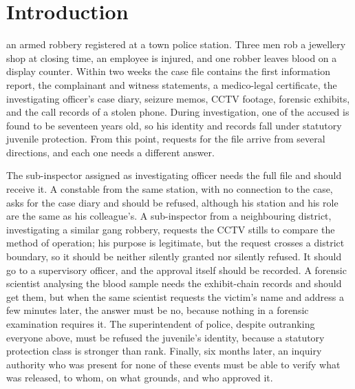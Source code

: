 \section{Introduction}
\label{sec:intro}

 an armed robbery registered at a town police
station. Three men rob a jewellery shop at closing time, an employee is
injured, and one robber leaves blood on a display counter. Within two weeks
the case file contains the first information report, the complainant and
witness statements, a medico-legal certificate, the investigating officer's
case diary, seizure memos, CCTV footage, forensic exhibits, and the call
records of a stolen phone. During investigation, one of the accused is found
to be seventeen years old, so his identity and records fall under statutory
juvenile protection. From this point, requests for the file arrive from
several directions, and each one needs a different answer.

The sub-inspector assigned as investigating officer needs the full file and
should receive it. A constable from the same station, with no connection to
the case, asks for the case diary and should be refused, although his station
and his role are the same as his colleague's. A sub-inspector from a
neighbouring district, investigating a similar gang robbery, requests the
CCTV stills to compare the method of operation; his purpose is legitimate,
but the request crosses a district boundary, so it should be neither silently
granted nor silently refused. It should go to a supervisory officer, and the
approval itself should be recorded. A forensic scientist analysing the blood
sample needs the exhibit-chain records and should get them, but when the same
scientist requests the victim's name and address a few minutes later, the
answer must be no, because nothing in a forensic examination requires it. The
superintendent of police, despite outranking everyone above, must be refused
the juvenile's identity, because a statutory protection class is stronger
than rank. Finally, six months later, an inquiry authority who was present
for none of these events must be able to verify what was released, to whom,
on what grounds, and who approved it.

